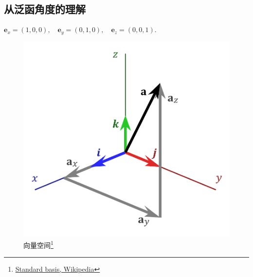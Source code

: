 \subsection{从泛函角度的理解}

\begin{frame}
    ${\mathbf  {e}}_{x}=(1,0,0),\quad {\mathbf  {e}}_{y}=(0,1,0),\quad {\mathbf {e}}_{z}=(0,0,1)$.

    \begin{figure}[!tb]
        \includegraphics[width=0.8\onepicwidth]{figure/gbdt/3D_Vector}
        \caption{向量空间\footnote{
                 \href{https://en.wikipedia.org/wiki/Standard_basis}{Standard basis, Wikipedia}}}
    \end{figure}
\end{frame}

\begin{frame}
    \begin{figure}
        \centering
        \resizebox{1.1\onepicwidth}{!}{}
    \end{figure}
\end{frame}

